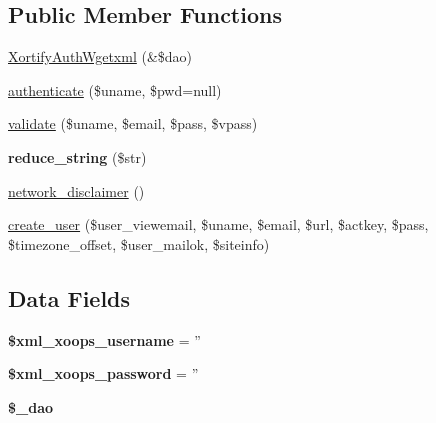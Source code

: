 \subsection*{Public Member Functions}
\begin{DoxyCompactItemize}
\item 
\hyperlink{class_xortify_auth_wgetxml_a877a7c66977f20634965c4ebe6657cfb}{Xortify\-Auth\-Wgetxml} (\&\$dao)
\item 
\hyperlink{class_xortify_auth_wgetxml_a00678ba307326b734e6c679f28bea315}{authenticate} (\$uname, \$pwd=null)
\item 
\hyperlink{class_xortify_auth_wgetxml_a91121a1b702dfd20fb65a027c8ed26ec}{validate} (\$uname, \$email, \$pass, \$vpass)
\item 
\hypertarget{class_xortify_auth_wgetxml_ae463a3baa44e95fa5b5151ab2334df1c}{{\bfseries reduce\-\_\-string} (\$str)}\label{class_xortify_auth_wgetxml_ae463a3baa44e95fa5b5151ab2334df1c}

\item 
\hyperlink{class_xortify_auth_wgetxml_a1874c27b6f81a3f2ff9015405ad0f8bc}{network\-\_\-disclaimer} ()
\item 
\hyperlink{class_xortify_auth_wgetxml_ac72efc5ad313a592cf6706876f56f7ec}{create\-\_\-user} (\$user\-\_\-viewemail, \$uname, \$email, \$url, \$actkey, \$pass, \$timezone\-\_\-offset, \$user\-\_\-mailok, \$siteinfo)
\end{DoxyCompactItemize}
\subsection*{Data Fields}
\begin{DoxyCompactItemize}
\item 
\hypertarget{class_xortify_auth_wgetxml_a725df0dd6b578e15522ed15945e5901c}{{\bfseries \$xml\-\_\-xoops\-\_\-username} = ''}\label{class_xortify_auth_wgetxml_a725df0dd6b578e15522ed15945e5901c}

\item 
\hypertarget{class_xortify_auth_wgetxml_a8ec2889165c837354fded1cedbd42157}{{\bfseries \$xml\-\_\-xoops\-\_\-password} = ''}\label{class_xortify_auth_wgetxml_a8ec2889165c837354fded1cedbd42157}

\item 
\hypertarget{class_xortify_auth_wgetxml_a12a029c610f699b4b25e79a1f64a3485}{{\bfseries \$\-\_\-dao}}\label{class_xortify_auth_wgetxml_a12a029c610f699b4b25e79a1f64a3485}

\end{DoxyCompactItemize}


